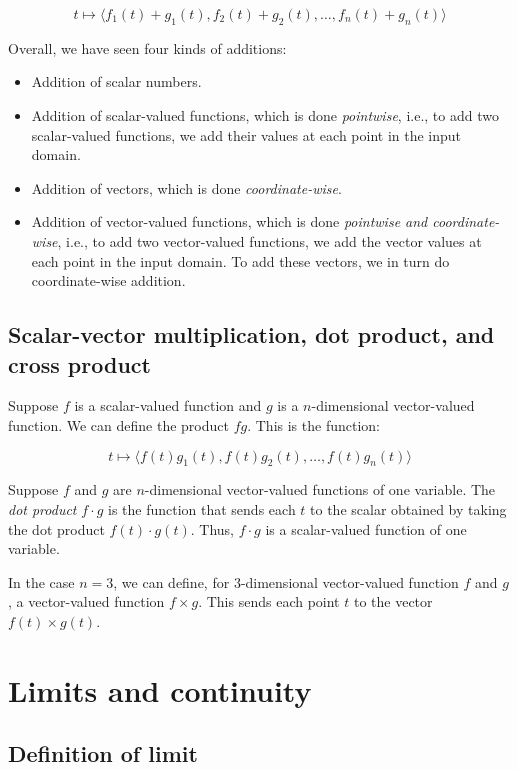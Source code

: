 \documentclass[10pt]{amsart}
\begin{document}
$$t \mapsto \langle f_1(t) + g_1(t), f_2(t) + g_2(t), \dots, f_n(t) + g_n(t) \rangle$$

Overall, we have seen four kinds of additions:

\begin{itemize}
\item Addition of scalar numbers.
\item Addition of scalar-valued functions, which is done {\em
  pointwise}, i.e., to add two scalar-valued functions, we add their
  values at each point in the input domain.
\item Addition of vectors, which is done {\em coordinate-wise}.
\item Addition of vector-valued functions, which is done {\em
  pointwise and coordinate-wise}, i.e., to add two vector-valued
  functions, we add the vector values at each point in the input
  domain. To add these vectors, we in turn do coordinate-wise
  addition.
\end{itemize}

\subsection{Scalar-vector multiplication, dot product, and cross product}

Suppose $f$ is a scalar-valued function and $g$ is a $n$-dimensional
vector-valued function. We can define the product $fg$. This is the
function:

$$t \mapsto \langle f(t)g_1(t), f(t)g_2(t), \dots, f(t)g_n(t) \rangle$$

Suppose $f$ and $g$ are $n$-dimensional vector-valued functions of one
variable. The {\em dot product} $f \cdot g$ is the function that sends
each $t$ to the scalar obtained by taking the dot product $f(t) \cdot
g(t)$. Thus, $f \cdot g$ is a scalar-valued function of one variable.

In the case $n = 3$, we can define, for $3$-dimensional vector-valued
function $f$ and $g$, a vector-valued function $f \times g$. This
sends each point $t$ to the vector $f(t) \times g(t)$.

\section{Limits and continuity}

\subsection{Definition of limit}
\end{document}
